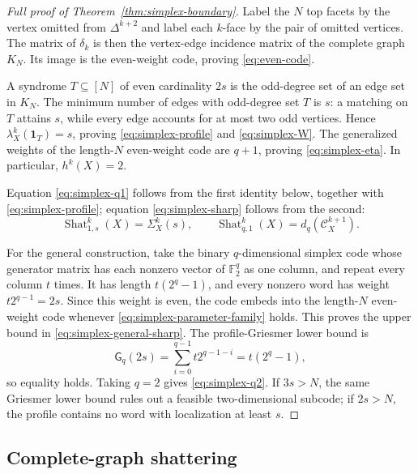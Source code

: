 \documentclass[11pt,letterpaper]{article}
\theoremstyle{plain}
\theoremstyle{definition}
\newcommand{\F}{\mathbb{F}_2}
\newcommand{\cC}{\mathcal{C}}
\newcommand{\Shat}{\operatorname{Shat}}
\newcommand{\1}{\mathbf{1}}
\begin{document}
\begin{proof}[Full proof of Theorem~\ref{thm:simplex-boundary}]
Label the $N$ top facets by the vertex omitted from $\Delta^{k+2}$ and label each
$k$-face by the pair of omitted vertices.  The matrix of $\delta_k$ is then the
vertex-edge incidence matrix of the complete graph $K_N$.  Its image is the even-weight
code, proving \eqref{eq:even-code}.

A syndrome $T\subseteq[N]$ of even cardinality $2s$ is the odd-degree set of an edge set
in $K_N$.  The minimum number of edges with odd-degree set $T$ is $s$: a matching on
$T$ attains $s$, while every edge accounts for at most two odd vertices.  Hence
$\lambda_X^k(\1_T)=s$, proving \eqref{eq:simplex-profile} and
\eqref{eq:simplex-W}.  The generalized weights of the length-$N$ even-weight code are
$q+1$, proving \eqref{eq:simplex-eta}.  In particular, $h^k(X)=2$.

Equation \eqref{eq:simplex-q1} follows from the first identity below, together with
\eqref{eq:simplex-profile}; equation \eqref{eq:simplex-sharp} follows from the second:
\[
 \Shat_{1,s}^k(X)=\Sigma_X^k(s),
 \qquad
 \Shat_{q,1}^k(X)=d_q(\cC_X^{k+1}).
\]

For the general construction, take the binary $q$-dimensional simplex code whose
generator matrix has each nonzero vector of $\F^q$ as one column, and repeat every
column $t$ times.  It has length $t(2^q-1)$, and every nonzero word has weight
$t2^{q-1}=2s$.  Since this weight is even, the code embeds into the length-$N$
even-weight code whenever \eqref{eq:simplex-parameter-family} holds.  This proves the
upper bound in \eqref{eq:simplex-general-sharp}.  The profile-Griesmer lower bound is
\[
 \mathsf G_q(2s)
 =\sum_{i=0}^{q-1}t2^{q-1-i}
 =t(2^q-1),
\]
so equality holds.  Taking $q=2$ gives \eqref{eq:simplex-q2}.  If $3s>N$, the same
Griesmer lower bound rules out a feasible two-dimensional subcode; if $2s>N$, the
profile contains no word with localization at least $s$.
\end{proof}

\subsection{Complete-graph shattering}
\label{app:complete-graph-proof}
\end{document}
